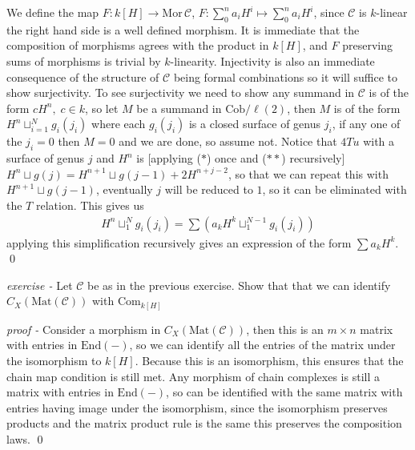 \documentclass[11pt]{article}
\theoremstyle{definition}
\newcommand{\mor}{\text{Mor}}
\begin{document}
    We define the map \(F: k[H] \to \mor\,\mathcal{C}\), \(F: \sum_0^n a_i H^i \mapsto \sum_0^n a_i H^i\), since \(\mathcal{C}\) is \(k\)-linear the right hand side is a well defined morphism. It is immediate that the composition of morphisms agrees with the product in \(k[H]\), and \(F\) preserving sums of morphisms is trivial by \(k\)-linearity. Injectivity is also an immediate consequence of the structure of \(\mathcal{C}\) being formal combinations so it will suffice to show surjectivity. To see surjectivity we need to show any summand in \(\mathcal{C}\) is of the form \(cH^n,\; c \in k\), so let \(M\) be a summand in \(\text{Cob}/\ell(2)\), then \(M\) is of the form \(H^n \sqcup_{i=1}^N g_i(j_i)\) where each \(g_i(j_i)\) is a closed surface of genus \(j_i\), if any one of the \(j_i = 0\) then \(M = 0\) and we are done, so assume not. Notice that \(4Tu\) with a surface of genus \(j\) and \(H^n\) is [applying (\(*\)) once and (\(**\)) recursively] \(H^{n}\sqcup g(j) = H^{n+1}\sqcup g(j-1) + 2H^{n+j - 2}\), so that we can repeat this with \(H^{n+1} \sqcup g(j-1)\), eventually \(j\) will be reduced to \(1\), so it can be eliminated with the \(T\) relation. This gives us
    \begin{align*}
        H^n \sqcup_1^N g_i(j_i) = \sum \left(a_kH^k\sqcup_1^{N-1} g_i(j_i)\right)
    \end{align*}
    applying this simplification recursively gives an expression of the form \(\sum a_kH^k\). \qed



    


    \emph{exercise - } Let \(\mathcal{C}\) be as in the previous exercise. Show that that we can identify \(C_X(\text{Mat}(\mathcal{C}))\) with \(\text{Com}_{k[H]}\)

    \emph{proof - } Consider a morphism in \(C_X(\text{Mat}(\mathcal{C}))\), then this is an \(m\times n\) matrix with entries in \(\text{End}(-)\), so we can identify all the entries of the matrix under the isomorphism to \(k[H]\). Because this is an isomorphism, this ensures that the chain map condition is still met. Any morphism of chain complexes is still a matrix with entries in \(\text{End}(-)\), so can be identified with the same matrix with entries having image under the isomorphism, since the isomorphism preserves products and the matrix product rule is the same this preserves the composition laws. \qed
\end{document}
